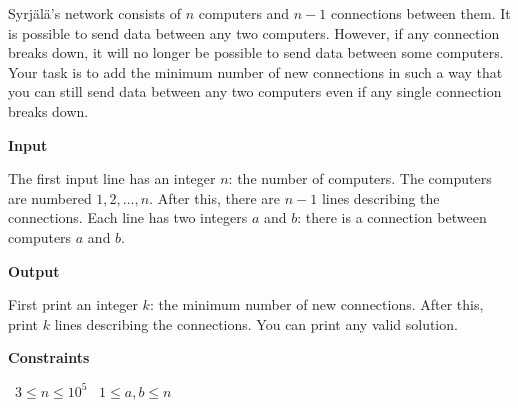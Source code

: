 Syrjälä's network consists of $n$ computers and $n-1$ connections between them. It is possible to send data between any two computers.
However, if any connection breaks down, it will no longer be possible to send data between some computers. Your task is to add the minimum number of new connections in such a way that you can still send data between any two computers even if any single connection breaks down.

\vspace{0.3cm}\noindent\textbf{Input}

The first input line has an integer $n$: the number of computers. The computers are numbered $1,2,\dots,n$.
After this, there are $n-1$ lines describing the connections. Each line has two integers $a$ and $b$: there is a connection between computers $a$ and $b$.

\vspace{0.3cm}\noindent\textbf{Output}

First print an integer $k$: the minimum number of new connections. After this, print $k$ lines describing the connections. You can print any valid solution.

\vspace{0.3cm}\noindent\textbf{Constraints}

\textbullet\ $3 \le n \le 10^5$
\textbullet\ $1 \le a,b \le n$